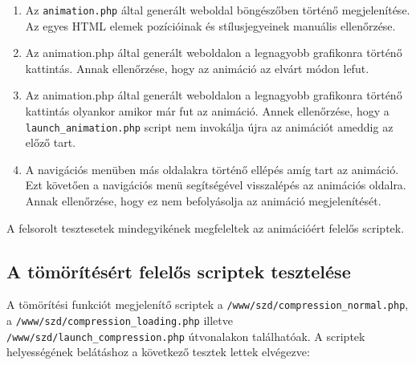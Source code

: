 \documentclass[oneside,titlepage,12pt,a4paper]{report}
\begin{document}
\begin{enumerate}
\item Az \texttt{animation.php} által generált weboldal böngészőben történő megjelenítése. Az egyes HTML elemek pozícióinak és stílusjegyeinek manuális ellenőrzése.
\item Az animation.php által generált weboldalon a legnagyobb grafikonra történő kattintás. Annak ellenőrzése, hogy az animáció az elvárt módon lefut.
\item Az animation.php által generált weboldalon a legnagyobb grafikonra történő kattintás olyankor amikor már fut az animáció. Annek ellenőrzése, hogy a \texttt{launch\_animation.php} script nem invokálja újra az animációt ameddig az előző tart.
\item A navigációs menüben más oldalakra történő ellépés amíg tart az animáció. Ezt követően a navigációs menü segítségével visszalépés az animációs oldalra. Annak ellenőrzése, hogy ez nem befolyásolja az animáció megjelenítését.
\end{enumerate}

A felsorolt tesztesetek mindegyikének megfeleltek az animációért felelős scriptek.

\subsection{A tömörítésért felelős scriptek tesztelése}

A tömörítési funkciót megjelenítő scriptek a \texttt{/www/szd/compression\_normal.php}, a \texttt{/www/szd/compression\_loading.php} illetve \texttt{/www/szd/launch\_compression.php} útvonalakon találhatóak. A scriptek helyességének belátáshoz a következő tesztek lettek elvégezve:
\end{document}
